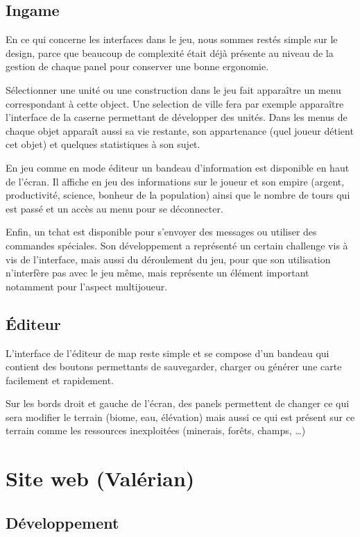 \documentclass[12pt]{report}
\begin{document}
\subsection{Ingame}

En ce qui concerne les interfaces dans le jeu, nous sommes restés simple sur le
design, parce que beaucoup de complexité était déjà présente au niveau de la
gestion de chaque panel pour conserver une bonne ergonomie.

Sélectionner une unité ou une construction dans le jeu fait apparaître un menu
correspondant à cette object. Une selection de ville fera par exemple apparaître
l’interface de la caserne permettant de développer des unités. Dans les menus de
chaque objet apparaît aussi sa vie restante, son appartenance (quel joueur
détient cet objet) et quelques statistiques à son sujet.

En jeu comme en mode éditeur un bandeau d’information est disponible en haut de
l’écran. Il affiche en jeu des informations sur le joueur et son empire (argent,
productivité, science, bonheur de la population) ainsi que le nombre de tours
qui est passé et un accès au menu pour se déconnecter.

Enfin, un tchat est disponible pour s’envoyer des messages ou utiliser des
commandes spéciales. Son développement a représenté un certain challenge vis à
vis de l’interface, mais aussi du déroulement du jeu, pour que son utilisation
n’interfère pas avec le jeu même, mais représente un élément important notamment
pour l’aspect multijoueur.

\subsection{Éditeur}

L’interface de l’éditeur de map reste simple et se compose d’un bandeau qui
contient des boutons permettants de sauvegarder, charger ou générer une carte
facilement et rapidement.

Sur les bords droit et gauche de l’écran, des panels permettent de changer ce
qui sera modifier le terrain (biome, eau, élévation) mais aussi ce qui est
présent sur ce terrain comme les ressources inexploitées (minerais, forêts,
champs, …) 

\section{Site web (Valérian)}

\subsection{Développement}
\end{document}
